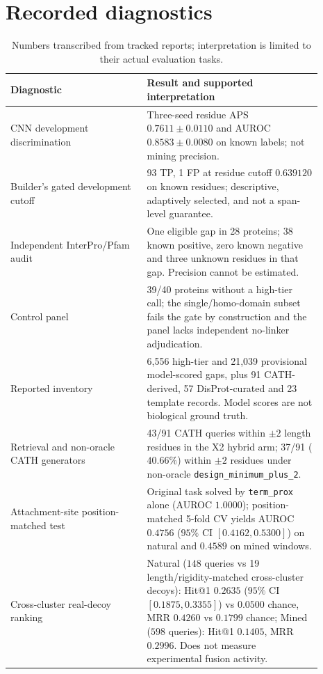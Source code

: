 \documentclass{article}
\begin{document}
\section{Recorded diagnostics}
\begin{table}[h]
\centering
\small
\begin{tabular}{p{0.39\linewidth}p{0.50\linewidth}}
\toprule
Diagnostic & Result and supported interpretation \\
\midrule
CNN development discrimination & Three-seed residue APS $0.7611\pm0.0110$ and AUROC $0.8583\pm0.0080$ on known labels; not mining precision. \\
Builder's gated development cutoff & 93 TP, 1 FP at residue cutoff $0.639120$ on known residues; descriptive, adaptively selected, and not a span-level guarantee. \\
Independent InterPro/Pfam audit & One eligible gap in 28 proteins; 38 known positive, zero known negative and three unknown residues in that gap. Precision cannot be estimated. \\
Control panel & 39/40 proteins without a high-tier call; the single/homo-domain subset fails the gate by construction and the panel lacks independent no-linker adjudication. \\
Reported inventory & 6,556 high-tier and 21,039 provisional model-scored gaps, plus 91 CATH-derived, 57 DisProt-curated and 23 template records. Model scores are not biological ground truth. \\
Retrieval and non-oracle CATH generators & 43/91 CATH queries within $\pm2$ length residues in the X2 hybrid arm; 37/91 ($40.66\%$) within $\pm2$ residues under non-oracle \texttt{design\_minimum\_plus\_2}. \\
Attachment-site position-matched test & Original task solved by \texttt{term\_prox} alone (AUROC $1.0000$); position-matched 5-fold CV yields AUROC $0.4756$ ($95\%$ CI $[0.4162, 0.5300]$) on natural and $0.4589$ on mined windows. \\
Cross-cluster real-decoy ranking & Natural ($148$ queries vs 19 length/rigidity-matched cross-cluster decoys): Hit@1 $0.2635$ ($95\%$ CI $[0.1875, 0.3355]$) vs $0.0500$ chance, MRR $0.4260$ vs $0.1799$ chance; Mined ($598$ queries): Hit@1 $0.1405$, MRR $0.2996$. Does not measure experimental fusion activity. \\
\bottomrule
\end{tabular}
\caption{Numbers transcribed from tracked reports; interpretation is limited to their actual evaluation tasks.}
\end{table}
\end{document}
